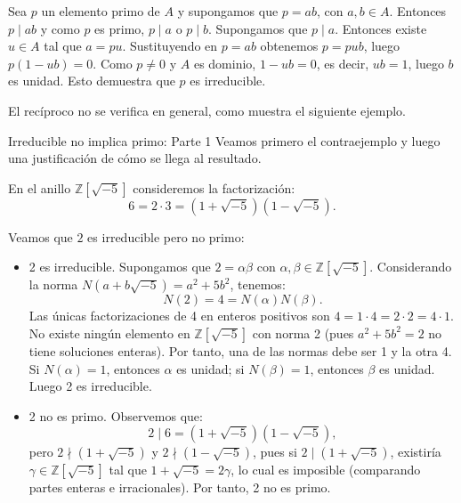 \begin{proofbox}
Sea \(p\) un elemento primo de \(A\) y supongamos que \(p = ab\), con \(a, b \in A\). Entonces \(p \mid ab\) y como \(p\) es primo, \(p \mid a\) o \(p \mid b\). Supongamos que \(p \mid a\). Entonces existe \(u \in A\) tal que \(a = pu\). Sustituyendo en \(p = ab\) obtenemos \(p = pub\), luego \(p(1 - ub) = 0\). Como \(p \neq 0\) y \(A\) es dominio, \(1 - ub = 0\), es decir, \(ub = 1\), luego \(b\) es unidad. Esto demuestra que \(p\) es irreducible.
\end{proofbox}

El recíproco no se verifica en general, como muestra el siguiente ejemplo.

\begin{example}{Irreducible no implica primo: Parte 1}{}
Veamos primero el contraejemplo y luego una justificación de cómo se llega al resultado.

En el anillo \(\mathbb{Z}[\sqrt{-5}]\) consideremos la factorización:
\[
6 = 2 \cdot 3 = (1 + \sqrt{-5})(1 - \sqrt{-5}).
\]

Veamos que \(2\) es irreducible pero no primo:
\begin{itemize}
\item 2 es irreducible. Supongamos que \(2 = \alpha\beta\) con \(\alpha, \beta \in \mathbb{Z}[\sqrt{-5}]\). Considerando la norma \(N(a + b\sqrt{-5}) = a^2 + 5b^2\), tenemos:
\[
N(2) = 4 = N(\alpha)N(\beta).
\]
Las únicas factorizaciones de 4 en enteros positivos son \(4 = 1 \cdot 4 = 2 \cdot 2 = 4 \cdot 1\). No existe ningún elemento en \(\mathbb{Z}[\sqrt{-5}]\) con norma 2 (pues \(a^2 + 5b^2 = 2\) no tiene soluciones enteras). Por tanto, una de las normas debe ser 1 y la otra 4. Si \(N(\alpha) = 1\), entonces \(\alpha\) es unidad; si \(N(\beta) = 1\), entonces \(\beta\) es unidad. Luego 2 es irreducible.

\item 2 no es primo. Observemos que:
\[
2 \mid 6 = (1 + \sqrt{-5})(1 - \sqrt{-5}),
\]
pero \(2 \nmid (1 + \sqrt{-5})\) y \(2 \nmid (1 - \sqrt{-5})\), pues si \(2 \mid (1 + \sqrt{-5})\), existiría \(\gamma \in \mathbb{Z}[\sqrt{-5}]\) tal que \(1 + \sqrt{-5} = 2\gamma\), lo cual es imposible (comparando partes enteras e irracionales). Por tanto, 2 no es primo.
\end{itemize}

\end{example}


